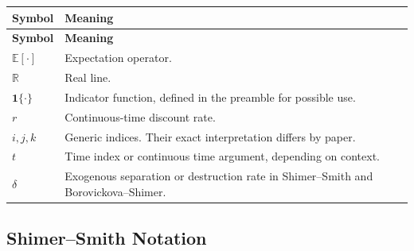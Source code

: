 \documentclass[11pt]{article}
\newcommand{\E}{\mathbb{E}}
\newcommand{\R}{\mathbb{R}}
\newcommand{\1}{\mathbf{1}}
\begin{document}
\begin{longtable}{p{}p{}}
\toprule
\textbf{Symbol} & \textbf{Meaning} \\
\midrule
\endfirsthead
\toprule
\textbf{Symbol} & \textbf{Meaning} \\
\midrule
\endhead
\bottomrule
\endfoot
$\E[\cdot]$ & Expectation operator. \\
$\R$ & Real line. \\
$\1\{\cdot\}$ & Indicator function, defined in the preamble for possible use. \\
$r$ & Continuous-time discount rate. \\
$i,j,k$ & Generic indices. Their exact interpretation differs by paper. \\
$t$ & Time index or continuous time argument, depending on context. \\
$\delta$ & Exogenous separation or destruction rate in Shimer--Smith and Borovickova--Shimer. \\
\end{longtable}

\subsection*{Shimer--Smith Notation}
\end{document}
